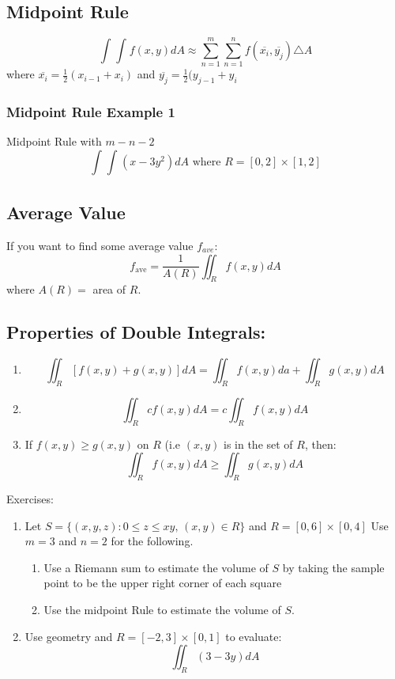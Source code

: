 \documentclass[12pt]{article}
\begin{document}
\subsection{Midpoint Rule}
\[
	\int_{}^{} \int_{}^{} f(x,y)dA \approx \sum_{n=1}^{m} \sum_{n=1}^{n} f(\overline{x_i}, \overline{y_j})\triangle A
\]
where \(\overline{x_i} = \frac{1}{2}(x_{i-1} + x_i)	\) and \(\overline{y_j} = \frac{1}{2}(y_{j-1} + y_i	\)

\subsubsection{Midpoint Rule Example 1	}
Midpoint Rule with \(m-n-2\)
\[
	\int_{}^{} \int_{}^{} (x - 3y^2)dA \text{ where } R = [0,2] \times [1,2]
\]

\subsection{Average Value}
If you want to find some average value \(f_{ave}\):
\[
	f_{\text{ave}} = \frac{1}{A(R)} \iint_{R}f(x,y)dA
\]
where \(A(R) = \) area of \(R\).

\subsection{Properties of Double Integrals:}
\begin{enumerate}
	\item \[
			\iint_{R}[f(x,y) + g(x,y)]dA = \iint_{R}f(x,y)da + \iint_{R}g(x,y)dA
	\]
	\item \[
		\iint_{R}cf(x,y)dA = c \iint_{R}f(x,y)dA
	\]
	\item If \(f(x,y) \geq g(x,y)\) on \(R\) (i.e \((x,y)\) is in the set of \(R\), then: 
	\[
	\iint_{R}f(x,y)dA \geq \iint_{R}g(x,y)dA
\] 
\end{enumerate}

Exercises:
\begin{enumerate}
	\item Let \(S = \{(x,y,z): 0 \leq z \leq xy \text{, }(x,y) \in R\}\) and \(R = [0,6] \times [0,4] \) Use \( m = 3\) and \( n = 2\) for the following.
			\begin{enumerate}
				\item Use a Riemann sum to estimate the volume of \(S\) by taking the sample point to be the upper right corner of each square
				\item Use the midpoint Rule to estimate the volume of \(S\).
			\end{enumerate}
		\item Use geometry and \(R = [-2,3] \times  [0,1]\) to evaluate: 
			\[
				\iint_{R}(3-3y)dA
			\]
\end{enumerate}
\end{document}
